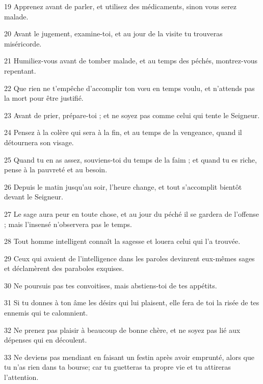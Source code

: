 \par 19 Apprenez avant de parler, et utilisez des médicaments, sinon vous serez malade.
\par 20 Avant le jugement, examine-toi, et au jour de la visite tu trouveras miséricorde.
\par 21 Humiliez-vous avant de tomber malade, et au temps des péchés, montrez-vous repentant.
\par 22 Que rien ne t'empêche d'accomplir ton vœu en temps voulu, et n'attends pas la mort pour être justifié.
\par 23 Avant de prier, prépare-toi ; et ne soyez pas comme celui qui tente le Seigneur.
\par 24 Pensez à la colère qui sera à la fin, et au temps de la vengeance, quand il détournera son visage.
\par 25 Quand tu en as assez, souviens-toi du temps de la faim ; et quand tu es riche, pense à la pauvreté et au besoin.
\par 26 Depuis le matin jusqu'au soir, l'heure change, et tout s'accomplit bientôt devant le Seigneur.
\par 27 Le sage aura peur en toute chose, et au jour du péché il se gardera de l'offense ; mais l'insensé n'observera pas le temps.
\par 28 Tout homme intelligent connaît la sagesse et louera celui qui l'a trouvée.
\par 29 Ceux qui avaient de l'intelligence dans les paroles devinrent eux-mêmes sages et déclamèrent des paraboles exquises.
\par 30 Ne poursuis pas tes convoitises, mais abstiens-toi de tes appétits.
\par 31 Si tu donnes à ton âme les désirs qui lui plaisent, elle fera de toi la risée de tes ennemis qui te calomnient.
\par 32 Ne prenez pas plaisir à beaucoup de bonne chère, et ne soyez pas lié aux dépenses qui en découlent.
\par 33 Ne deviens pas mendiant en faisant un festin après avoir emprunté, alors que tu n'as rien dans ta bourse; car tu guetteras ta propre vie et tu attireras l'attention.



